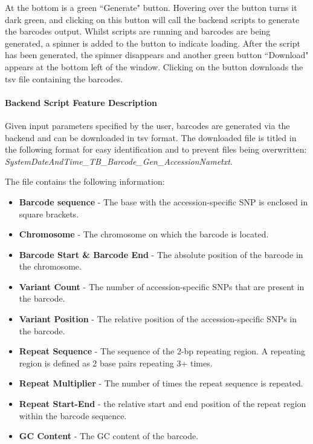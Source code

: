 \documentclass[12pt]{article}
\begin{document}
At the bottom is a green ``Generate" button. Hovering over the button turns it dark green, and clicking on this button will call the backend scripts to generate the barcodes output. Whilst scripts are running and barcodes are being generated, a spinner is added to the button to indicate loading. After the script has been generated, the spinner disappears and another green button ``Download" appears at the bottom left of the window. Clicking on the button downloads the tsv file containing the barcodes.  

\paragraph{Backend Script Feature Description}
Given input parameters specified by the user, barcodes are generated via the backend and can be downloaded in tsv format. The downloaded file is titled in the following format for easy identification and to prevent files being overwritten: \textit{SystemDateAndTime\_TB\_Barcode\_Gen\_AccessionName\.txt}.

The file contains the following information: 
\begin{itemize}
    \item \textbf{Barcode sequence} - The base with the accession-specific SNP is enclosed in square brackets.
    \item \textbf{Chromosome} - The chromosome on which the barcode is located.
    \item \textbf{Barcode Start \& Barcode End} - The absolute position of the barcode in the chromosome.
    \item \textbf{Variant Count} - The number of accession-specific SNPs that are present in the barcode.
    \item \textbf{Variant Position} - The relative position of the accession-specific SNPs in the barcode. 
    \item \textbf{Repeat Sequence} - The sequence of the 2-bp repeating region. A repeating region is defined as 2 base pairs repeating 3+ times. 
    \item \textbf{Repeat Multiplier} - The number of times the repeat sequence is repeated.
    \item \textbf{Repeat Start-End} - the relative start and end position of the repeat region within the barcode sequence. 
    \item \textbf{GC Content} - The GC content of the barcode. 
\end{itemize}
\end{document}
